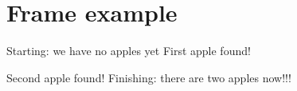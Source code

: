 \section{Frame example}
  Starting: we have no apples yet
    First apple found!

    Second apple found!
  Finishing: there are two apples now!!!
